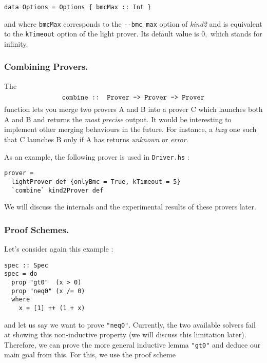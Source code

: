 \begin{lstlisting}[frame=single]
data Options = Options { bmcMax :: Int }
\end{lstlisting}

and where \texttt{bmcMax} corresponds to the \texttt{-\/-bmc\_max}
option of \emph{kind2} and is equivalent to the \texttt{kTimeout} option
of the light prover. Its default value is $0,$ which stands for infinity.

\subsubsection{Combining Provers.}\label{combining-provers}

The
$$\texttt{combine :: Prover -\textgreater{} Prover -\textgreater{} Prover}$$
function lets you merge two provers A and B into a prover C which
launches both A and B and returns the \emph{most precise} output. It
would be interesting to implement other merging behaviours in the
future. For instance, a \emph{lazy} one such that C launches B only if A
has returns \emph{unknown} or \emph{error}.

As an example, the following prover is used in \texttt{Driver.hs} :

\begin{lstlisting}[frame=single]
prover =
  lightProver def {onlyBmc = True, kTimeout = 5} 
  `combine` kind2Prover def
\end{lstlisting}

We will discuss the internals and the experimental results of these
provers later.

\subsubsection{Proof Schemes.}\label{proof-schemes}

Let's consider again this example :

\begin{lstlisting}[frame=single]
spec :: Spec
spec = do
  prop "gt0"  (x > 0)
  prop "neq0" (x /= 0)
  where
    x = [1] ++ (1 + x)

\end{lstlisting}
and let us say we want to prove \texttt{"neq0"}. Currently, the two
available solvers fail at showing this non-inductive property (we will
discuss this limitation later). Therefore, we can prove the more general
inductive lemma \texttt{"gt0"} and deduce our main goal from this. For
this, we use the proof scheme

